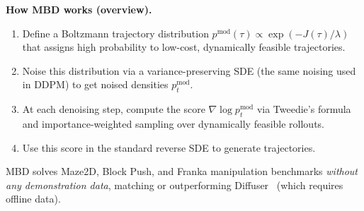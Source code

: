 \documentclass[11pt,letterpaper]{article}
\theoremstyle{plain}
\theoremstyle{definition}
\theoremstyle{remark}
\newcommand{\grad}{\nabla}
\begin{document}
\textbf{How MBD works (overview).}
\begin{enumerate}[nosep]
  \item Define a Boltzmann trajectory distribution
    $p^{\mathrm{mod}}(\tau)\propto\exp(-J(\tau)/\lambda)$ that assigns
    high probability to low-cost, dynamically feasible trajectories.
  \item Noise this distribution via a variance-preserving SDE (the same
    noising used in DDPM) to get noised densities $p^{\mathrm{mod}}_t$.
  \item At each denoising step, compute the score
    $\grad\log p^{\mathrm{mod}}_t$ via Tweedie's formula and
    importance-weighted sampling over dynamically feasible rollouts.
  \item Use this score in the standard reverse SDE to generate
    trajectories.
\end{enumerate}

MBD solves Maze2D, Block Push, and Franka manipulation benchmarks
\emph{without any demonstration data}, matching or outperforming
Diffuser~\citep{janner2022} (which requires offline data).
\end{document}

